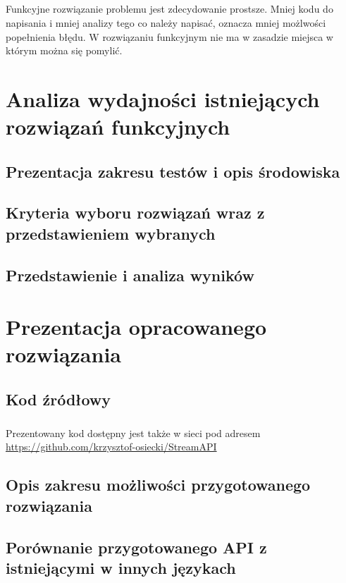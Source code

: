 \documentclass[a4paper,10pt]{report}
\begin{document}
\paragraph{}
Funkcyjne rozwiązanie problemu jest zdecydowanie prostsze. Mniej kodu do napisania i mniej analizy tego co należy napisać, oznacza mniej możlwości popełnienia błędu. W rozwiązaniu funkcyjnym nie ma w zasadzie miejsca w którym można się pomylić. 
\chapter{Analiza wydajności istniejących rozwiązań funkcyjnych}
\section{Prezentacja zakresu testów i opis środowiska}
\section{Kryteria wyboru rozwiązań wraz z przedstawieniem wybranych}
\section{Przedstawienie i analiza wyników}
\chapter{Prezentacja opracowanego rozwiązania}
\section{Kod źródłowy}

\paragraph{}
Prezentowany kod dostępny jest także w sieci pod adresem \hyperref[https://github.com/krzysztof-osiecki/StreamAPI]{https://github.com/krzysztof-osiecki/StreamAPI}
\section{Opis zakresu możliwości przygotowanego rozwiązania}
\section{Porównanie przygotowanego API z istniejącymi w innych językach}
\end{document}
